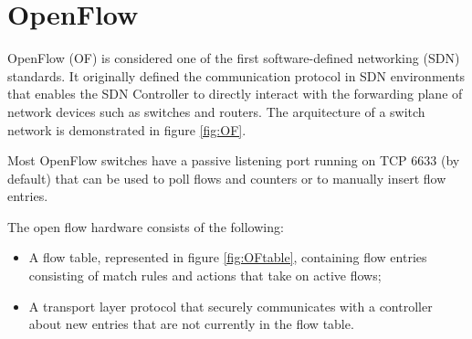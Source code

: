 \documentclass[]{report}
\begin{document}
\section{OpenFlow}

OpenFlow (OF) is considered one of the first software-defined networking (SDN) standards. It originally defined the communication protocol in SDN environments that enables the SDN Controller to directly interact with the forwarding plane of network devices such as switches and routers. The arquitecture of a switch network is demonstrated in figure \ref{fig:OF}. 

\begin{minipage}{\linewidth}%

\label{fig:OF}
\end{minipage}

Most OpenFlow switches have a passive listening port running on TCP 6633 (by default) that can be used to poll flows and counters or to manually insert flow entries.
 
The open flow hardware consists of the following:
\begin{itemize}
\item A flow table, represented in figure \ref{fig:OFtable}, containing flow entries consisting of match rules and actions that take on active flows;
\item A transport layer protocol that securely communicates with a controller about new entries that are not currently in the flow table.
\end{itemize}
\end{document}
